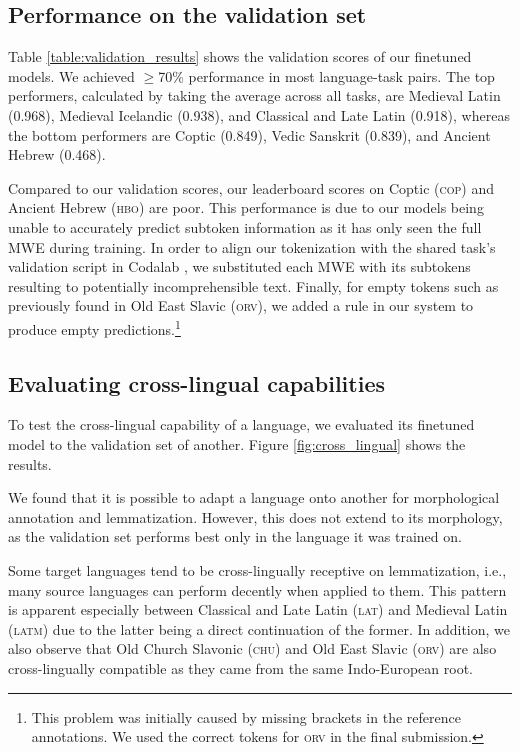 \documentclass[11pt]{article}
\begin{document}
\subsection{Performance on the validation set}



Table \ref{table:validation_results} shows the validation scores of our finetuned models.
We achieved $\geq$70\% performance in most language-task pairs.
The top performers, calculated by taking the average across all tasks, are Medieval Latin (0.968), Medieval Icelandic (0.938), and Classical and Late Latin (0.918),
whereas the bottom performers are Coptic (0.849), Vedic Sanskrit (0.839), and Ancient Hebrew (0.468).

Compared to our validation scores, our leaderboard scores on Coptic (\textsc{cop}) and Ancient Hebrew (\textsc{hbo}) are poor.
This performance is due to our models being unable to accurately predict subtoken information as it has only seen the full MWE during training.
In order to align our tokenization with the shared task's validation script in Codalab \cite{pavao-etal-2023-codalab}, we substituted each MWE with its subtokens resulting to potentially incomprehensible text.
Finally, for empty tokens such as previously found in Old East Slavic (\textsc{orv}), we added a rule in our system to produce empty predictions.\footnote[1]{This problem was initially caused by missing brackets in the reference annotations. We used the correct tokens for \textsc{orv} in the final submission.}

\subsection{Evaluating cross-lingual capabilities}
\label{sec:results_crosslingual}

To test the cross-lingual capability of a language, we evaluated its finetuned model to the validation set of another.
Figure \ref{fig:cross_lingual} shows the results.

We found that it is possible to adapt a language onto another for morphological annotation and lemmatization.
However, this does not extend to its morphology, as the validation set performs best only in the language it was trained on.

Some target languages tend to be cross-lingually receptive on lemmatization, i.e., many source languages can perform decently when applied to them.
This pattern is apparent especially between Classical and Late Latin (\textsc{lat}) and Medieval Latin (\textsc{latm}) due to the latter being a direct continuation of the former.
In addition, we also observe that Old Church Slavonic (\textsc{chu}) and Old East Slavic (\textsc{orv}) are also cross-lingually compatible as they came from the same Indo-European root.
\end{document}
